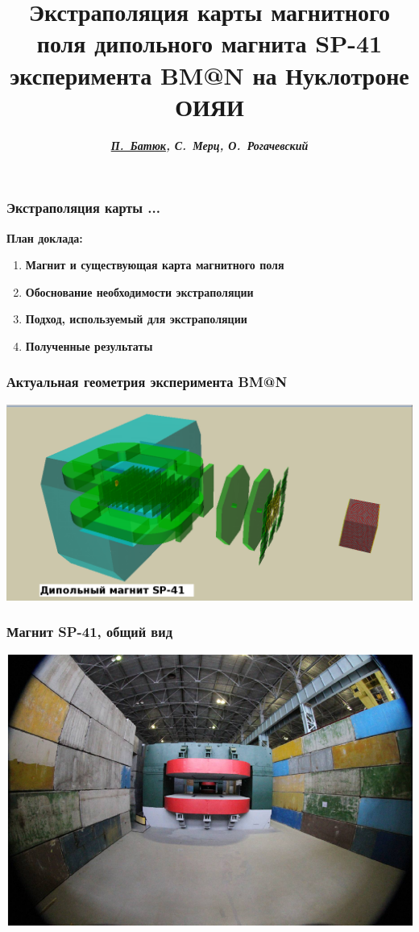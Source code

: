 \documentclass[svgnames] {beamer}
\title[Экстраполяция карты магнитного поля дипольного магнита SP-41 эксперимента BM@N ...]{\textbf{\large {Экстраполяция карты магнитного поля дипольного магнита SP-41 эксперимента BM@N на Нуклотроне ОИЯИ}}}
\author[П. Батюк]{\textit{\textbf{{\footnotesize \underline{П.~Батюк}, С.~Мерц, О.~Рогачевский}}}}
\institute{\url{batyuk@jinr.ru}  \\ Лаборатория Физики Высоких Энергий, ОИЯИ}
\begin{document}
\maketitle

\begin{frame}
  \frametitle{\centering Экстраполяция карты ... }
  \begin{block}{\textbf {\centering План доклада:}}
    \begin{enumerate}
    \item \textbf {Магнит и существующая карта магнитного поля} 
      \newline
    \item \textbf {Обоснование необходимости экстраполяции} 
      \newline
    \item \textbf {Подход, используемый для экстраполяции}
      \newline
    \item \textbf {Полученные результаты}
    \end{enumerate}
  \end{block}
\end{frame}

\begin{frame}
 \frametitle{Актуальная геометрия эксперимента BM@N}
 \begin{center}
   \includegraphics[width=1.0\linewidth]{bmn_genView.png}
 \end{center}
\end{frame}

\begin{frame}
  \frametitle{Магнит SP-41, общий вид}
  \begin{center}
  \includegraphics[width=0.8\linewidth]{sp41_genView.png}
  \end{center}
\end{frame}
\end{document}
